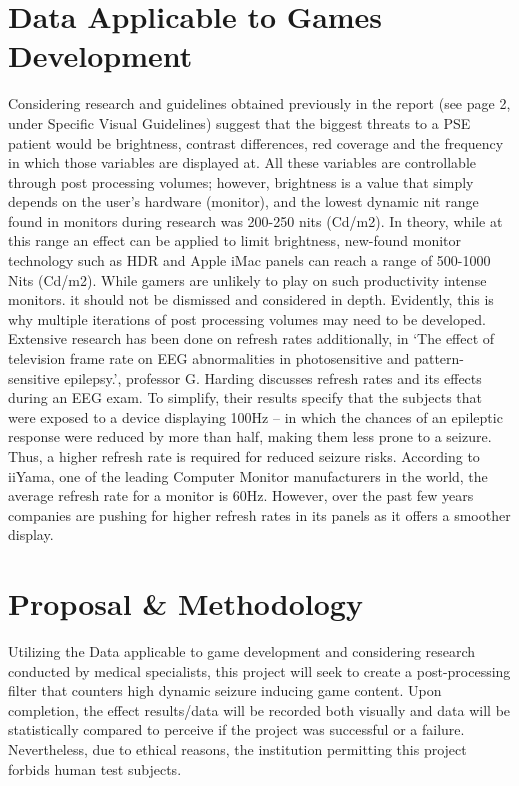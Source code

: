 \documentclass[twocolumn, 10pt, conference]{ieeetran}
\begin{document}
\section{Data Applicable to Games Development}
Considering research and guidelines obtained previously in the report (see page 2, under Specific Visual Guidelines) suggest that the biggest threats to a PSE patient would be brightness, contrast differences, red coverage and the frequency in which those variables are displayed at. All these variables are controllable through post processing volumes; however, brightness is a value that simply depends on the user’s hardware (monitor), and the lowest dynamic nit range found in monitors during research was 200-250 nits (Cd/m2). In theory, while at this range an effect can be applied to limit brightness, new-found monitor technology such as HDR and Apple iMac panels can reach a range of 500-1000 Nits (Cd/m2). While gamers are unlikely to play on such productivity intense monitors. it should not be dismissed and considered in depth. Evidently, this is why multiple iterations of post processing volumes may need to be developed.\\
Extensive research has been done on refresh rates additionally, in ‘The effect of television frame rate on EEG abnormalities in photosensitive and pattern-sensitive epilepsy.’,\cite{fylan1997effect} professor G. Harding discusses refresh rates and its effects during an EEG exam. To simplify, their results specify that the subjects that were exposed to a device displaying 100Hz – in which the chances of an epileptic response were reduced by more than half, making them less prone to a seizure. Thus, a higher refresh rate is required for reduced seizure risks. According to iiYama, one of the leading Computer Monitor manufacturers in the world, the average refresh rate for a monitor is 60Hz. However, over the past few years companies are pushing for higher refresh rates in its panels as it offers a smoother display.

\section{Proposal \& Methodology}
Utilizing the Data applicable to game development and considering research conducted by medical specialists, this project will seek to create a post-processing filter that counters high dynamic seizure inducing game content. Upon completion, the effect results/data will be recorded both visually and data will be statistically compared to perceive if the project was successful or a failure. Nevertheless, due to ethical reasons, the institution permitting this project forbids human test subjects.
\end{document}
